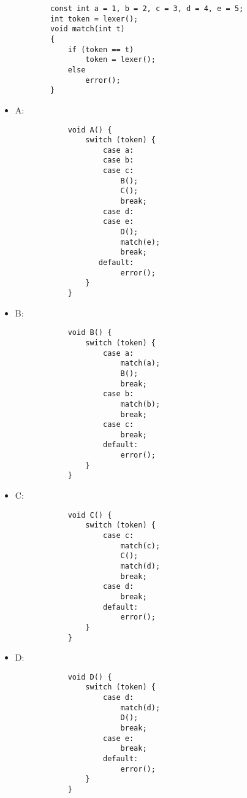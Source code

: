 \documentclass[12pt, A4]{article}
\begin{document}
	\begin{itemize}
        \begin{verbatim}
        const int a = 1, b = 2, c = 3, d = 4, e = 5;
        int token = lexer();
        void match(int t)
        {
            if (token == t)
                token = lexer();
            else
                error();
        }
        \end{verbatim}
        
		\item A: 
			\begin{verbatim}
            void A() {
                switch (token) {
                    case a:
                    case b:
                    case c:
                        B();
                        C();
                        break;
                    case d:
                    case e:
                        D();
                        match(e);
                        break;
                   default:
                        error();
                }
            }
			\end{verbatim}
        \newpage
		\item B:
            \begin{verbatim}
            void B() {
                switch (token) {
                    case a:
                        match(a);
                        B();
                        break;
                    case b:
                        match(b);
                        break;
                    case c:
                        break;
                    default:
                        error();
                }
            }
            \end{verbatim}
		\item C:
            \begin{verbatim}
            void C() {
                switch (token) {
                    case c:
                        match(c);
                        C();
                        match(d);
                        break;
                    case d:
                        break;
                    default:
                        error();
                }
            }
            \end{verbatim}
        \newpage
		\item D:
            \begin{verbatim}
            void D() {
                switch (token) {
                    case d:
                        match(d);
                        D();
                        break;
                    case e:
                        break;
                    default:
                        error();
                }
            }
            \end{verbatim}
	\end{itemize}
	
\end{document}

